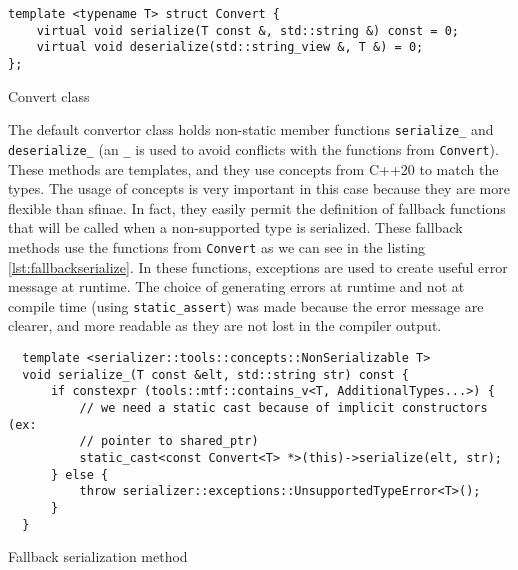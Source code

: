 \begin{listing}[ht!]
\begin{verbatim}
template <typename T> struct Convert {
    virtual void serialize(T const &, std::string &) const = 0;
    virtual void deserialize(std::string_view &, T &) = 0;
};
\end{verbatim}
\caption{Convert class}
\label{lst:convert}
\end{listing}

The default convertor class holds non-static member functions
\texttt{serialize\_} and \texttt{deserialize\_} (an \texttt{\_} is used to avoid
conflicts with the functions from \texttt{Convert}). These methods are
templates, and they use concepts from C++20 to match the types. The usage of
concepts is very important in this case because they are more flexible than
\gls{sfinae}. In fact, they easily permit the definition of fallback functions
that will be called when a non-supported type is serialized. These fallback
methods use the functions from \texttt{Convert} as we can see in the listing
\ref{lst:fallbackserialize}. In these functions, exceptions are used to create
useful error message at runtime. The choice of generating errors at runtime and
not at compile time (using \texttt{static\_assert}) was made because the error
message are clearer, and more readable as they are not lost in the compiler
output.

\begin{listing}[ht!]
\begin{verbatim}
  template <serializer::tools::concepts::NonSerializable T>
  void serialize_(T const &elt, std::string str) const {
      if constexpr (tools::mtf::contains_v<T, AdditionalTypes...>) {
          // we need a static cast because of implicit constructors (ex:
          // pointer to shared_ptr)
          static_cast<const Convert<T> *>(this)->serialize(elt, str);
      } else {
          throw serializer::exceptions::UnsupportedTypeError<T>();
      }
  }
\end{verbatim}
\caption{Fallback serialization method}
\label{lstd:fallbackserialize}
\end{listing}

